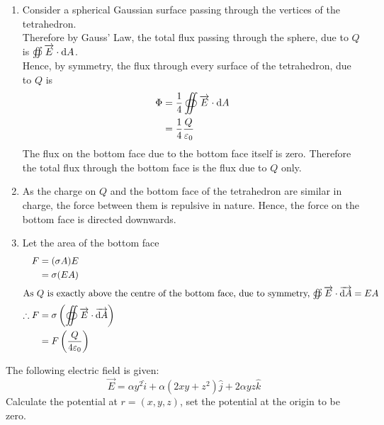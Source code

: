 \documentclass[fleqn, a4paper, 12pt, twoside]{article}
\theoremstyle{definition}
\theoremstyle{theorem}
\begin{document}
\begin{solution}
	\begin{enumerate}[leftmargin=*]
		\item 
			Consider a spherical Gaussian surface passing through the vertices of the tetrahedron.\\
			Therefore by Gauss' Law, the total flux passing through the sphere, due to $Q$ is $\oiint \overrightarrow{E} \cdot \dif A$.\\
			Hence, by symmetry, the flux through every surface of the tetrahedron, due to $Q$ is 
			\begin{align*}
				\Phi &= \dfrac{1}{4} \oiint \overrightarrow{E} \cdot \dif A\\
				&= \dfrac{1}{4} \dfrac{Q}{\varepsilon_0}
			\end{align*}
			The flux on the bottom face due to the bottom face itself is zero.
			Therefore the total flux through the bottom face is the flux due to $Q$ only.
		\item
			As the charge on $Q$ and the bottom face of the tetrahedron are similar in charge, the force between them is repulsive in nature.
			Hence, the force on the bottom face is directed downwards.
		\item
			Let the area of the bottom face
			\begin{align*}
				F &= (\sigma A) E\\
				&= \sigma (E A)\\
				\intertext{As $Q$ is exactly above the centre of the bottom face, due to symmetry, $\oiint \overrightarrow{E} \cdot \overrightarrow{\dif A} = E A$}
				\therefore F &= \sigma \left( \oiint \overrightarrow{E} \cdot \overrightarrow{\dif A} \right)\\
				&= F \left( \dfrac{Q}{4 \varepsilon_0} \right)
			\end{align*}
	\end{enumerate}
\end{solution}

\begin{question}
	The following electric field is given:
	\begin{equation*}
		\overrightarrow{E} = \alpha y^2 \hat{i} + \alpha (2 x y + z^2) \hat{j} + 2 \alpha y z \hat{k}
	\end{equation*}
	Calculate the potential at ⃗$r = (x,y,z)$, set the potential at the origin to be zero.
\end{question}
\end{document}
